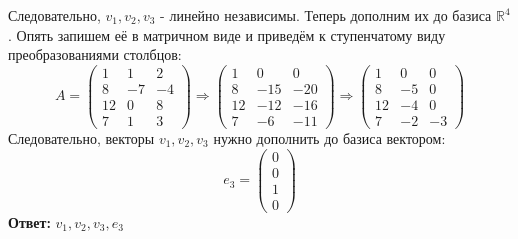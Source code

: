 \documentclass[a4paper]{article}
\newcommand{\mat}[1]{\begin{pmatrix} #1 \end{pmatrix}}
\renewcommand{\r}{\Rightarrow}
\newcommand{\RR}{\mathbb{R}}
\begin{document}
\begin{enumerate}
    Следовательно, $v_1, v_2, v_3$ - линейно независимы. Теперь дополним их до базиса $\RR^4$.
    Опять запишем её в матричном виде и приведём к ступенчатому виду преобразованиями столбцов:
    $$A = \begin{pmatrix}
        1 & 1 & 2 \\
        8 & -7 & -4 \\
        12 & 0 & 8 \\
        7 & 1 & 3
        \end{pmatrix} \r \begin{pmatrix}
            1 & 0 & 0 \\
            8 & -15 & -20 \\
            12 & -12 & -16 \\
            7 & -6 & -11
            \end{pmatrix} \r \begin{pmatrix}
                1 & 0 & 0 \\
                8 & -5 & 0 \\
                12 & -4 & 0 \\
                7 & -2 & -3
                \end{pmatrix}$$
    Следовательно, векторы $v_1, v_2, v_3$ нужно дополнить до базиса вектором:
    $$e_3 = \mat{0\\0\\1\\0}$$
    \textbf{Ответ: }$v_1, v_2, v_3, e_3$
\end{enumerate}
\end{document}
